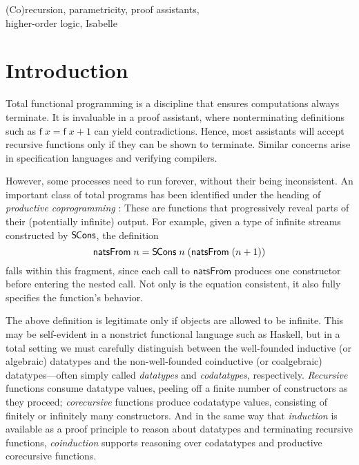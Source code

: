 \documentclass[preprint,draft]
{sigplanconf}
\newcommand\TC{\mathsf}
\newcommand{\<}{\langle}
\renewcommand{\>}{\rangle}
\newcommand{\SCons}{{{\mathsf{S\hspace*{-0.2ex}Cons}}}}
\newcommand\const[1]{{\ensuremath{\TC{#1}}}}
\begin{document}
{\raggedright \keywords
(Co)recursion,
parametricity,
proof assistants, \\
higher-order logic,
Isabelle
}



















\section{Introduction}
\label{sec-intro}

Total functional programming is a discipline that ensures computations
always terminate. It is invaluable in a proof assistant, where nonterminating
definitions such as $\const{f}\;x = \const{f}\;x + 1$ can yield
contradictions. Hence, most assistants will accept recursive functions
only if they can be shown to terminate. Similar concerns arise in specification
languages and verifying compilers.


However, some processes need to run forever, without their being inconsistent.
An important class of total programs has been identified under the heading of
\emph{productive coprogramming}
\cite{turner-1995,abbott-et-al-2005,mcbride-productive}: These
are functions that progressively reveal parts of their (potentially infinite)
output. For example, given a type of infinite streams constructed by $\SCons$,
the definition
\[\const{natsFrom}\;n  =  \SCons\;n\;(\const{natsFrom}\;(n + 1))\]
falls within this fragment, since each call to \const{natsFrom} produces one
constructor before entering the nested call. Not only is the equation
consistent, it also fully specifies the function's behavior.

The above definition is legitimate only if objects are allowed to be infinite.
This may be self-evident in a nonstrict functional language such as Haskell, but
in a total setting we must carefully distinguish between the well-founded
inductive (or algebraic) datatypes and the non-well-founded
coinductive (or coalgebraic) datatypes---often simply called
\emph{datatypes} and \emph{codatatypes}, respectively.
\emph{Recursive} functions consume datatype values, peeling off a finite number
of constructors as they proceed; \emph{co\-recursive} functions produce
codatatype values, consisting of finitely or infinitely many constructors. And
in the same
way that \emph{induction} is available as a proof principle to reason about
datatypes and terminating recursive functions, \emph{coinduction}
supports reasoning over codatatypes and productive corecursive functions.
\end{document}
